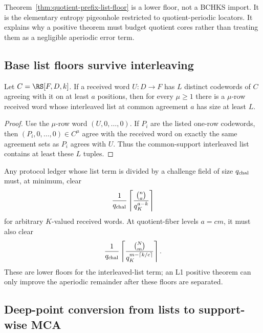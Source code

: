 \begin{remark}
Theorem~\ref{thm:quotient-prefix-list-floor} is a lower floor, not a BCHKS
import.  It is the elementary entropy pigeonhole restricted to quotient-periodic
locators.  It explains why a positive theorem must budget quotient cores rather
than treating them as a negligible aperiodic error term.
\end{remark}

\subsection{Base list floors survive interleaving}

\begin{proposition}
\label{prop:base-floor-embeds-interleaving}
Let \(C=\RS[F,D,k]\).  If a received word \(U:D\to F\) has \(L\) distinct
codewords of \(C\) agreeing with it on at least \(a\) positions, then for every
\(\mu\geq1\) there is a \(\mu\)-row received word whose interleaved list at
common agreement \(a\) has size at least \(L\).
\end{proposition}

\begin{proof}
Use the \(\mu\)-row word \((U,0,\ldots,0)\).  If \(P_i\) are the listed
one-row codewords, then \((P_i,0,
\ldots,0)\in C^\mu\) agree with the received word on exactly the same agreement
sets as \(P_i\) agrees with \(U\).  Thus the common-support interleaved list
contains at least these \(L\) tuples.
\end{proof}

\begin{corollary}
\label{cor:challenge-list-budget-gate}
Any protocol ledger whose list term is divided by a challenge field of size
\(q_{\rm chal}\) must, at minimum, clear
\[
  {1\over q_{\rm chal}}
  \left\lceil {\binom{n}{a}\over q_K^{a-k}}\right\rceil
\]
for arbitrary \(K\)-valued received words.  At quotient-fiber levels \(a=cm\),
it must also clear
\[
  {1\over q_{\rm chal}}
  \left\lceil {\binom{N}{m}\over q_K^{m-\lceil k/c\rceil}}\right\rceil .
\]
These are lower floors for the interleaved-list term; an L1 positive theorem can
only improve the aperiodic remainder after these floors are separated.
\end{corollary}

\subsection{Deep-point conversion from lists to support-wise MCA}


